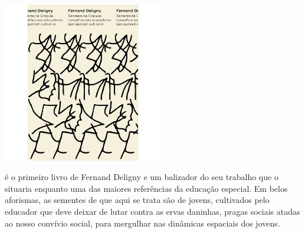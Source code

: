 \begin{center}
\hspace*{-3cm}
\hspace*{3cm}\includegraphics[width=70mm]{./grid/deligny.jpeg}
\end{center}

\hspace*{-7cm}\hrulefill\hspace*{-7cm}

\medskip

 é o primeiro livro de Fernand Deligny e um balizador do seu trabalho que o situaria enquanto uma das maiores referências da educação especial. Em belos aforismas, as sementes de que aqui se trata são de jovens, cultivados pelo educador que deve deixar de lutar contra as ervas daninhas, pragas sociais atadas ao nosso convívio social, para mergulhar nas dinâmicas espaciais dos jovens.

\vfill

\hspace*{-.4cm}\begin{minipage}[c]{1\linewidth}
\small{
{}}
\end{minipage}

\pagebreak

\hspace{.5cm}

